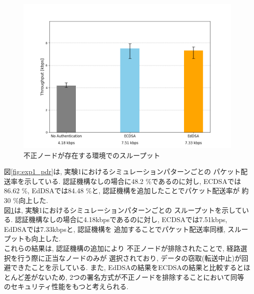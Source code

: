 \begin{figure}
  \centering
  \includegraphics[width=1\textwidth]{figures/exp1_throughput.png}
  \caption{不正ノードが存在する環境でのスループット}
  \label{fig:exp1_throughput}
\end{figure}


\indent 図\ref{fig:exp1_pdr}は, 実験1におけるシミュレーションパターンごとの
パケット配送率を示している. 認証機構なしの場合に48.2 \%であるのに対し, 
ECDSAでは86.62 \%, EdDSAでは84.48 \%と, 認証機構を追加したことでパケット配送率が
約30 \%向上した. \\
\indent 図\ref{fig:exp1_throughput}は, 実験1におけるシミュレーションパターンごとの
スループットを示している. 認証機構なしの場合に4.18kbpsであるのに対し, 
ECDSAでは7.51kbps, EdDSAでは7.33kbpsと, 認証機構を
追加することでパケット配送率同様, スループットも向上した. \\
\indent これらの結果は, 認証機構の追加により 
不正ノードが排除されたことで, 経路選択を行う際に正当なノードのみが
選択されており,  データの窃取(転送中止)が回避できたことを示している. 
また, EdDSAの結果をECDSAの結果と比較するとほとんど差がないため, 
2つの署名方式が不正ノードを排除することにおいて同等のセキュリティ性能をもつと考えられる. 



